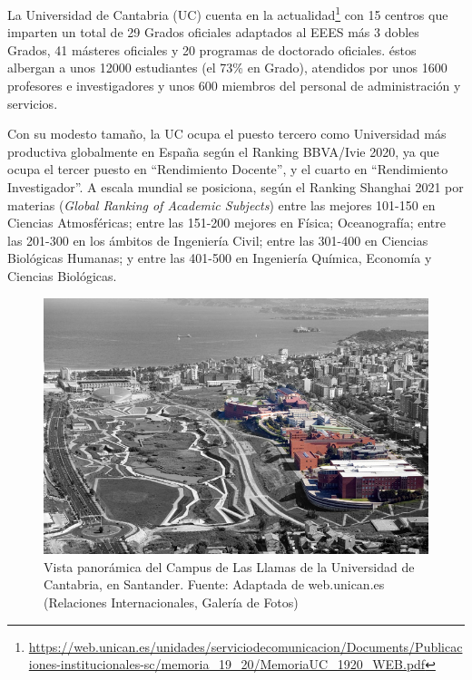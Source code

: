 La Universidad de Cantabria (UC) cuenta en la actualidad\footnote{%
\url{https://web.unican.es/unidades/serviciodecomunicacion/Documents/Publicaciones-institucionales-sc/memoria_19_20/MemoriaUC_1920_WEB.pdf}} con 15 centros que imparten un total de 29 Grados oficiales adaptados al EEES más 3 dobles Grados, 41 másteres oficiales y 20 programas de doctorado oficiales. éstos albergan a unos 12000 estudiantes (el 73\% en Grado), atendidos por unos 1600 profesores e investigadores y unos 600 miembros del personal de administración y servicios.

Con su modesto tamaño, la UC ocupa el puesto tercero como Universidad más productiva globalmente en España según el Ranking BBVA/Ivie 2020, ya que ocupa el tercer puesto en ``Rendimiento Docente'', y el cuarto en ``Rendimiento  Investigador''. A escala mundial se posiciona, según el Ranking Shanghai 2021 por materias (\emph{Global Ranking of Academic Subjects}) entre las mejores 101-150 en Ciencias Atmosféricas; entre las 151-200 mejores en Física; Oceanografía; entre las 201-300 en los ámbitos de Ingeniería Civil; entre las 301-400 en Ciencias Biológicas Humanas; y entre las 401-500 en Ingeniería Química, Economía y Ciencias Biológicas.


\begin{figure}
\begin{center}
\includegraphics[width=\textwidth]{fig/Campus_las_llamas_3.jpg}
\end{center}
\caption{\label{fig:campusllamas}
Vista panorámica del Campus de Las Llamas de la Universidad de Cantabria, en Santander. Fuente: Adaptada de web.unican.es (Relaciones Internacionales, Galería de Fotos)}
\end{figure}

